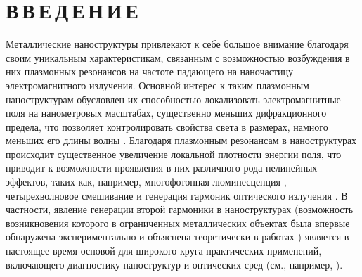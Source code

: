 \documentclass[12pt, a4paper]{article}
\begin{document}
\newpage

\section*{В\,В\,Е\,Д\,Е\,Н\,И\,Е}

Металлические наноструктуры привлекают к себе большое внимание благодаря своим уникальным характеристикам, связанным с возможностью возбуждения в них плазмонных резонансов на частоте падающего на наночастицу электромагнитного излучения.
Основной интерес к таким плазмонным наноструктурам обусловлен их способностью локализовать электромагнитные поля на нанометровых масштабах, существенно меньших дифракционного предела, что позволяет контролировать свойства света в размерах, намного меньших его длины волны \cite{Mai2007, Gram2010}.
Благодаря плазмонным резонансам в наноструктурах происходит существенное увеличение локальной плотности энергии поля, что приводит к возможности проявления в них различного рода нелинейных эффектов, таких как, например, многофотонная люминесценция \cite{Cas2011,biagioni2012,chen2021, ko2011}, четырехволновое смешивание \cite{danckwerts2007, harutyunyan2012, paspalakis2014, singh2016} и генерация гармоник оптического излучения \cite{drobyh2020, smirnova2014, TorresTorres2010}.
В частности, явление генерации второй гармоники в наноструктурах  (возможность возникновения которого в ограниченных металлических объектах была впервые обнаружена экспериментально и объяснена теоретически в работах \cite{franken1961, Bloembergen1962}) является в настоящее время основой для широкого круга практических применений, включающего диагностику наноструктур и оптических сред (см., например, \cite{butet2015, Butet2012}).
\end{document}
